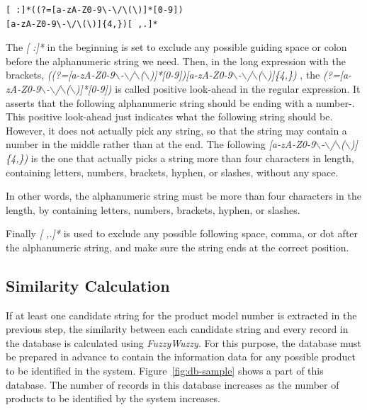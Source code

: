 \documentclass[technicalreport]{ieicej}
\begin{document}
            \begin{center}
            \begin{BVerbatim}
[ :]*((?=[a-zA-Z0-9\-\/\(\)]*[0-9])
[a-zA-Z0-9\-\/\(\)]{4,})[ ,.]*
            \end{BVerbatim}
            \end{center}
    
        The {\em [ :]*} in the beginning is set to exclude any possible guiding space or colon before the alphanumeric string we need. Then, in the long expression with the brackets, {\em ((?=[a-zA-Z0-9$\backslash$-$\backslash$/$\backslash$($\backslash$)]*[0-9])[a-zA-Z0-9$\backslash$-$\backslash$/$\backslash$($\backslash$)]\{4,\}) }, the {\em (?=[a-zA-Z0-9$\backslash$-$\backslash$/$\backslash$($\backslash$)]*[0-9])} is called positive look-ahead in the regular expression. It asserts that the following alphanumeric string should be ending with a number\cite{lookahead}-\cite{regex-tutorial}. This positive look-ahead just indicates what the following string should be. However, it does not actually pick any string, so that the string may contain a number in the middle rather than at the end. The following {\em [a-zA-Z0-9$\backslash$-$\backslash$/$\backslash$($\backslash$)]\{4,\})} is the one that actually picks a string more than four characters in length, containing letters, numbers, brackets, hyphen, or slashes, without any space.

        In other words, the alphanumeric string must be more than four characters in the length, by containing letters, numbers, brackets, hyphen, or slashes.

        Finally {\em [ ,.]*} is used to exclude any possible following space, comma, or dot after the alphanumeric string, and make sure the string ends at the correct position.

        
\subsection{Similarity Calculation}
    \label{sec:algorithm.ocrregex}
        If at least one candidate string for the product model number is extracted in the previous step, the similarity between each candidate string and every record in the database is calculated using {\em FuzzyWuzzy}. For this purpose, the database must be prepared in advance to contain the information data for any possible product to be identified in the system. Figure~\ref{fig:db-sample} shows a part of this database. The number of records in this database increases as the number of products to be identified by the system increases.
\end{document}
